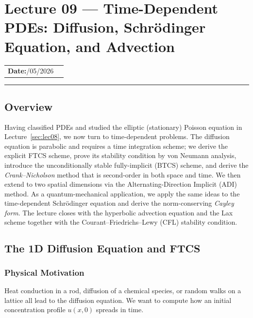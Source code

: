 
\section{Lecture 09 — Time-Dependent PDEs: Diffusion, Schr\"{o}dinger
  Equation, and Advection}\label{sec:lec09}

\begin{center}
\begin{tabular}{ll}
  \textbf{Date:}\quad 17/05/2026 & \\
\end{tabular}
\end{center}
\hrule\vspace{1.5em}

\subsection*{Overview}
Having classified PDEs and studied the elliptic (stationary) Poisson
equation in Lecture~\ref{sec:lec08}, we now turn to time-dependent
problems. The diffusion equation is parabolic and requires a time
integration scheme; we derive the explicit FTCS scheme, prove its
stability condition by von Neumann analysis, introduce the unconditionally
stable fully-implicit (BTCS) scheme, and derive the
\emph{Crank--Nicholson} method that is second-order in both space and
time. We then extend to two spatial dimensions via the
Alternating-Direction Implicit (ADI) method.  As a quantum-mechanical
application, we apply the same ideas to the time-dependent Schrödinger
equation and derive the norm-conserving \emph{Cayley form}.  The
lecture closes with the hyperbolic advection equation and the
Lax scheme together with the Courant–Friedrichs–Lewy (CFL) stability
condition.

\subsection{The 1D Diffusion Equation and FTCS}\label{subsec:lec09:ftcs}

\subsubsection*{Physical Motivation}
Heat conduction in a rod, diffusion of a chemical species, or random
walks on a lattice all lead to the diffusion equation.  We want to
compute how an initial concentration profile $u(x,0)$ spreads in time.

